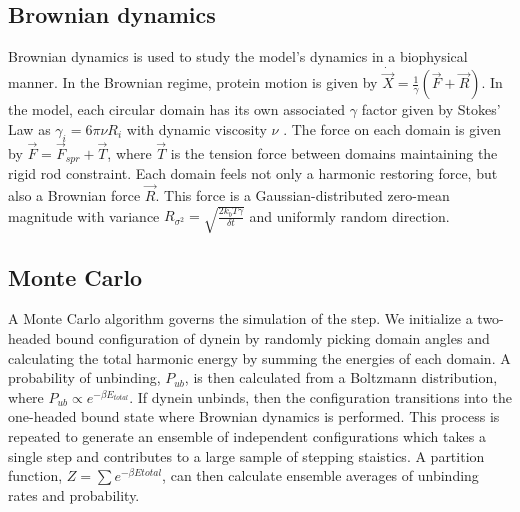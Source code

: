 \documentclass[9pt,twocolumn,twoside]{article}
\begin{document}
\subsection*{Brownian dynamics}
Brownian dynamics is used to study the model's dynamics in a biophysical manner. In the Brownian regime, protein motion is given by $\dot{\vec{X}} = \frac{1}{\gamma}\left(\vec{F}+\vec{R}\right)$. In the model, each circular domain has its own associated $\gamma$ factor given by Stokes' Law as $\gamma_i = 6\pi\nu R_i$ with dynamic viscosity $\nu$ \cite{stokeslaw}. The force on each domain is given by $\vec{F} = \vec{F}_{spr} + \vec{T}$, where $\vec{T}$ is the tension force between domains maintaining the rigid rod constraint. Each domain feels not only a harmonic restoring force, but also a Brownian force $\vec{R}$. This force is a Gaussian-distributed zero-mean magnitude with variance $R_{\sigma^2} = \sqrt{\frac{2k_bT\gamma}{\delta t}}$ and uniformly random direction.

\subsection*{Monte Carlo}
A Monte Carlo algorithm governs the simulation of the step. We initialize a two-headed bound configuration of dynein by randomly picking domain angles and calculating the total harmonic energy by summing the energies of each domain. A probability of unbinding, $P_{ub}$, is then calculated from a Boltzmann distribution, where $P_{ub}\propto e^{-\beta E_{total}}$. If dynein unbinds, then the configuration transitions into the one-headed bound state where Brownian dynamics is performed. This process is repeated to generate an ensemble of independent configurations which takes a single step and contributes to a large sample of stepping staistics. A partition function, $Z=\sum e^{-\beta E{total}}$, can then calculate ensemble averages of unbinding rates and probability.  
\end{document}
